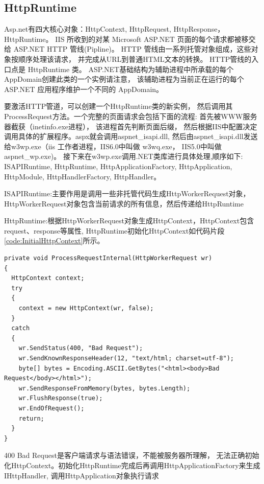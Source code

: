 \documentclass{book}
\begin{document}
\subsection{HttpRuntime}

Asp.net有四大核心对象：HttpContext, HttpRequest, HttpResponse，HttpRuntime。
IIS 所收到的对某 Microsoft ASP.NET 页面的每个请求都被移交给 ASP.NET HTTP 管线(Pipline)。
HTTP 管线由一系列托管对象组成，这些对象按顺序处理该请求，
并完成从URL到普通HTML文本的转换。
HTTP管线的入口点是 HttpRuntime 类。
ASP.NET基础结构为辅助进程中所承载的每个AppDomain创建此类的一个实例请注意，
该辅助进程为当前正在运行的每个 ASP.NET 应用程序维护一个不同的 AppDomain。

要激活HTTP管道，可以创建一个HttpRuntime类的新实例，
然后调用其ProcessRequest方法。一个完整的页面请求会包括下面的流程:
首先被WWW服务器截获（inetinfo.exe进程）， 该进程首先判断页面后缀， 
然后根据IIS中配置决定调用具体的扩展程序。aspx就会调用aspnet\_isapi.dll, 
然后由aspnet\_isapi.dll发送给w3wp.exe（iis 工作者进程，IIS6.0中叫做 w3wq.exe，
IIS5.0中叫做 aspnet\_wp.exe)。
接下来在w3wp.exe调用.NET类库进行具体处理,顺序如下:
ISAPIRuntime, HttpRuntime, HttpApplicationFactory, HttpApplication, 
HttpModule, HttpHandlerFactory, HttpHandler。

ISAPIRuntime:主要作用是调用一些非托管代码生成HttpWorkerRequest对象，
HttpWorkerRequest对象包含当前请求的所有信息，然后传递给HttpRuntime

HttpRuntime:根据HttpWorkerRequest对象生成HttpContext，HttpContext包含request、response等属性, 
HttpRuntime初始化HttpContext如代码片段\ref{code:InitialHttpContext}所示。

\begin{lstlisting}[language={[Sharp]C},caption=初始化HttpContext,label={code:InitialHttpContext}]
private void ProcessRequestInternal(HttpWorkerRequest wr)
{
  HttpContext context;
  try
  {
    context = new HttpContext(wr, false);
  }
  catch
  {
    wr.SendStatus(400, "Bad Request");
    wr.SendKnownResponseHeader(12, "text/html; charset=utf-8");
    byte[] bytes = Encoding.ASCII.GetBytes("<html><body>Bad Request</body></html>");
    wr.SendResponseFromMemory(bytes, bytes.Length);
    wr.FlushResponse(true);
    wr.EndOfRequest();
    return;
  }
}
\end{lstlisting}

400 Bad Request是客户端请求与语法错误，不能被服务器所理解，
无法正确初始化HttpContext。初始化HttpRuntime完成后再调用HttpApplicationFactory来生成IHttpHandler, 
调用HttpApplication对象执行请求
\end{document}
